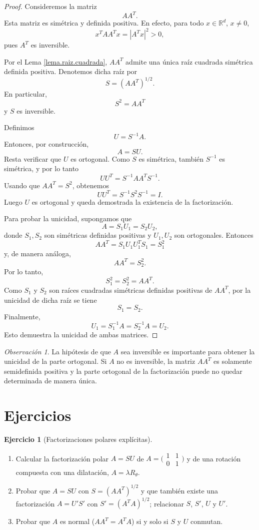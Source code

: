 \documentclass[12pt, a4paper]{amsbook}
\theoremstyle{remark}
\newtheorem{obs}[teo]{Observación}
\theoremstyle{definition}
\newtheorem{ejercicio}{Ejercicio}[chapter]
\numberwithin{section}{chapter}
\numberwithin{subsection}{section}
\numberwithin{equation}{section}
\numberwithin{figure}{chapter}
\begin{document}
\begin{proof}
Consideremos la matriz
\[
AA^T.
\]
Esta matriz es simétrica y definida positiva. En efecto, para todo
$x\in\mathbb R^d$, $x\neq 0$,
\[
x^TAA^Tx
=
|A^Tx|^2>0,
\]
pues $A^T$ es inversible.

Por el Lema \ref{lema.raiz.cuadrada}, $AA^T$ admite una única raíz cuadrada
simétrica definida positiva. Denotemos dicha raíz por
\[
S=(AA^T)^{1/2}.
\]
En particular,
\[
S^2=AA^T
\]
y $S$ es inversible.

Definimos
\[
U=S^{-1}A.
\]
Entonces, por construcción,
\[
A=SU.
\]
Resta verificar que $U$ es ortogonal. Como $S$ es simétrica, también
$S^{-1}$ es simétrica, y por lo tanto
\[
UU^T
=
S^{-1}AA^TS^{-1}.
\]
Usando que $AA^T=S^2$, obtenemos
\[
UU^T
=
S^{-1}S^2S^{-1}
=
I.
\]
Luego $U$ es ortogonal y queda demostrada la existencia de la
factorización.

Para probar la unicidad, supongamos que
\[
A=S_1U_1=S_2U_2,
\]
donde $S_1,S_2$ son simétricas definidas positivas y
$U_1,U_2$ son ortogonales. Entonces
\[
AA^T
=
S_1U_1U_1^TS_1
=
S_1^2
\]
y, de manera análoga,
\[
AA^T=S_2^2.
\]
Por lo tanto,
\[
S_1^2=S_2^2=AA^T.
\]
Como $S_1$ y $S_2$ son raíces cuadradas simétricas definidas positivas
de $AA^T$, por la unicidad de dicha raíz se tiene
\[
S_1=S_2.
\]
Finalmente,
\[
U_1=S_1^{-1}A=S_2^{-1}A=U_2.
\]
Esto demuestra la unicidad de ambas matrices.
\end{proof}

\begin{obs}
La hipótesis de que $A$ sea inversible es importante para obtener la
unicidad de la parte ortogonal. Si $A$ no es inversible, la matriz
$AA^T$ es solamente semidefinida positiva y la parte ortogonal de la
factorización puede no quedar determinada de manera única.
\end{obs}


\section*{Ejercicios}

\begin{ejercicio}[Factorizaciones polares explícitas]\label{ejer.FP.ejemplos}
\leavevmode
\begin{enumerate}[label=(\alph*)]
\item Calcular la factorización polar $A=SU$ de
$A=\bigl(\begin{smallmatrix}1&1\\0&1\end{smallmatrix}\bigr)$ y de una
rotación compuesta con una dilatación,
$A=\lambda R_\theta$.
\item Probar que $A=SU$ con $S=(AA^T)^{1/2}$ y que también existe una
factorización $A=U'S'$ con $S'=(A^TA)^{1/2}$; relacionar $S$, $S'$, $U$ y
$U'$.
\item Probar que $A$ es normal ($AA^T=A^TA$) si y solo si $S$ y $U$
conmutan.
\end{enumerate}
\end{ejercicio}
\end{document}
